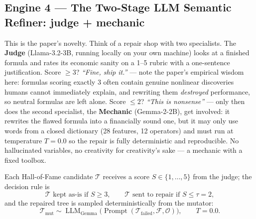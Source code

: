 \documentclass[11pt,a4paper]{article}
\begin{document}
\subsection{Engine 4 --- The Two-Stage LLM Semantic Refiner: judge + mechanic}

\begin{plaineng}
This is the paper's novelty. Think of a repair shop with two specialists. The
\textbf{Judge} (Llama-3.2-3B, running locally on your own machine) looks at a
finished formula and rates its economic sanity on a 1--5 rubric with a
one-sentence justification. Score $\ge 3$? \emph{``Fine, ship it.''} --- note
the paper's empirical wisdom here: formulas scoring exactly 3 often contain
genuine nonlinear discoveries humans cannot immediately explain, and rewriting
them \emph{destroyed} performance, so neutral formulas are left alone. Score
$\le 2$? \emph{``This is nonsense''} --- only then does the second specialist,
the \textbf{Mechanic} (Gemma-2-2B), get involved: it rewrites the flawed
formula into a financially sound one, but it may only use words from a closed
dictionary (28 features, 12 operators) and must run at temperature $T=0.0$ so
the repair is fully deterministic and reproducible. No hallucinated variables,
no creativity for creativity's sake --- a mechanic with a fixed toolbox.
\end{plaineng}

\begin{themath}
Each Hall-of-Fame candidate $\mathcal{T}$ receives a score
$S \in \{1,\dots,5\}$ from the judge; the decision rule is
\begin{equation}
  \mathcal{T} \text{ kept as-is if } S \ge 3,
  \qquad
  \mathcal{T} \text{ sent to repair if } S \le \tau = 2,
  \label{eq:gate}
\end{equation}
and the repaired tree is sampled deterministically from the mutator:
\begin{equation}
  \mathcal{T}_{\text{mut}} \sim
  \operatorname{LLM}_{\text{Gemma}}\!\bigl(
    \operatorname{Prompt}(\mathcal{T}_{\text{failed}}, \mathcal{F}, \mathcal{O})
  \bigr), \qquad T = 0.0 .
  \label{eq:repair}
\end{equation}
\end{themath}
\end{document}

